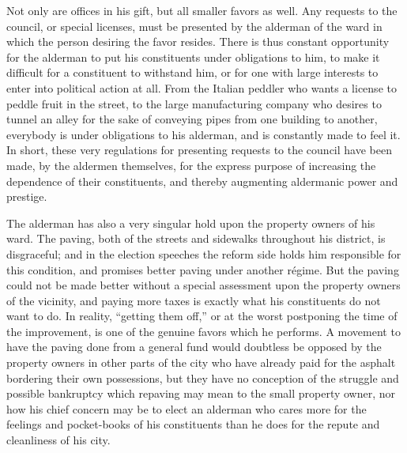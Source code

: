 \documentclass[]{article}
\begin{document}
\begin{sectionbody}
\addamsparagraph Not only are offices in his gift, but all smaller favors as well. Any
requests to the council, or special licenses, must be presented by the
alderman of the ward in which the person desiring the favor resides.
There is thus constant opportunity for the alderman to put his
constituents under obligations to him, to make it difficult for a
constituent to withstand him, or for one with large interests to enter
into political action at all. From the Italian peddler who wants a
license to peddle fruit in the street, to the large manufacturing
company who desires to tunnel an alley for the sake of conveying pipes
from one building to another, everybody is under obligations to his
alderman, and is constantly made to feel it. In short, these very
regulations for presenting requests to the council have been made, by
the aldermen themselves, for the express purpose of increasing the
dependence of their constituents, and thereby augmenting aldermanic
power and prestige.

\addamsparagraph The alderman has also a very singular hold upon the property owners of
his ward. The paving, both of the streets and sidewalks throughout his
district, is disgraceful; and in the election speeches the reform side
holds him responsible for this condition, and promises better paving
under another régime. But the paving could not be made better without a
special assessment upon the property owners of the vicinity, and paying
more taxes is exactly what his constituents do not want to do. In
reality, ``getting them off,'' or at the worst postponing the time of the
improvement, is one of the genuine favors which he performs. A movement
to have the paving done from a general fund would doubtless be opposed
by the property owners in other parts of the city who have already paid
for the asphalt bordering their own possessions, but they have no
conception of the struggle and possible bankruptcy which repaving may
mean to the small property owner, nor how his chief concern may be to
elect an alderman who cares more for the feelings and pocket-books of
his constituents than he does for the repute and cleanliness of his
city.


\end{sectionbody}
\end{document}
